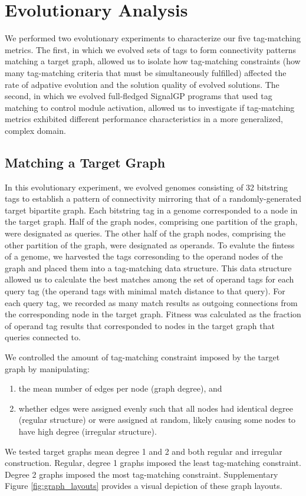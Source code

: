 \section{Evolutionary Analysis}

We performed two evolutionary experiments to characterize our five tag-matching metrics.
The first, in which we evolved sets of tags to form connectivity patterns matching a target graph, allowed us to isolate how tag-matching constraints (how many tag-matching criteria that must be simultaneously fulfilled) affected the rate of adpative evolution and the solution quality of evolved solutions.
The second, in which we evolved full-fledged SignalGP programs that used tag matching to control module activation, allowed us to investigate if tag-matching metrics exhibited different performance characteristics in a more generalized, complex domain.

\subsection{Matching a Target Graph}

In this evolutionary experiment, we evolved genomes consisting of 32 bitstring tags to establish a pattern of connectivity mirroring that of a randomly-generated target bipartite graph.
Each bitstring tag in a genome corresponded to a node in the target graph.
Half of the graph nodes, comprising one partition of the graph, were designated as queries.
The other half of the graph nodes, comprising the other partition of the graph, were designated as operands.
To evalute the fintess of a genome, we harvested the tags corresonding to the operand nodes of the graph and placed them into a tag-matching data structure.
This data structure allowed us to calculate the best matches among the set of operand tags for each query tag (the operand tags with minimal match distance to that query).
For each query tag, we recorded as many match results as outgoing connections from the corresponding node in the target graph.
Fitness was calculated as the fraction of operand tag results that corresponded to nodes in the target graph that queries connected to.

We controlled the amount of tag-matching constraint imposed by the target graph by manipulating:
\begin{enumerate}
  \item the mean number of edges per node (graph degree), and
  \item whether edges were assigned evenly such that all nodes had identical degree (regular structure) or were assigned at random, likely causing some nodes to have high degree (irregular structure).
\end{enumerate}
We tested target graphs mean degree 1 and 2 and both regular and irregular construction.
Regular, degree 1 graphs imposed the least tag-matching constraint.
Degree 2 graphs imposed the most tag-matching constraint.
Supplementary Figure \ref{fig:graph_layouts} provides a visual depiction of these graph layouts.

